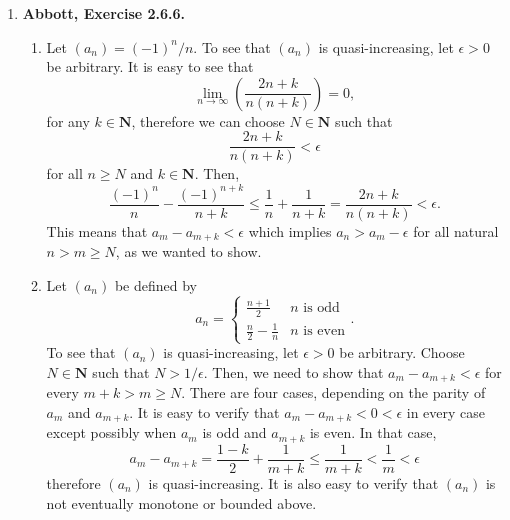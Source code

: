 \documentclass{article}
\makeatletter
\DeclarePairedDelimiter\abs{\lvert}{\rvert}
\let\oldabs\abs
\def\abs{\@ifstar{\oldabs}{\oldabs*}}
\newcommand{\N}{\mathbf{N}}
\newcommand{\exc}[2][Abbott]{\item \textbf{#1, Exercise #2.}}
\newcommand{\lep}[1][L]{#1et $\epsilon > 0$ be arbitrary}
\makeatother
\begin{document}
\begin{enumerate}
    To verify the second claim, \lep[l]. Since $(x_n)$ and $(y_n)$ are pseudo-Cauchy, we can choose $N \in \N$ such that $\abs{x_{n+1}-x_n}, \abs{y_{n+1}-y_n} < \epsilon/2$ for all $n \geq N$. Then, \begin{equation*}
        \abs{(x_{n+1}+y_{n+1}) - (x_n + y_n)} \leq \abs{x_{n+1}-x_n} + \abs{y_{n+1}-y_n} < \epsilon
    \end{equation*} for all $n \geq N$, therefore $(x_n + y_n)$ is also pseudo-Cauchy. 
    
    \exc{2.6.6}
    \begin{enumerate}
        \item Let $(a_n) = (-1)^n/n$. To see that $(a_n)$ is quasi-increasing, \lep[l]. It is easy to see that 
        \begin{equation*}
            \lim_{n \to \infty} \left(\frac{2n+k}{n(n+k)}\right) = 0,
        \end{equation*} for any $k \in \N$, therefore we can choose $N \in \N$ such that
        \begin{equation*}
            \frac{2n+k}{n(n+k)} < \epsilon
        \end{equation*} for all $n \geq N$ and $k \in \N$. Then, 
        \begin{equation*}
            \frac{(-1)^n}{n} - \frac{(-1)^{n+k}}{n+k} \leq \frac{1}{n} + \frac{1}{n+k} = \frac{2n+k}{n(n+k)} < \epsilon.
        \end{equation*} This means that $a_{m}-a_{m+k} < \epsilon$ which implies $a_n > a_m - \epsilon$ for all natural $n > m \geq N$, as we wanted to show.
        
        \item Let $(a_n)$ be defined by 
        \begin{equation*}
            a_n = \begin{cases}
            \frac{n+1}{2} & n \text{ is odd} \\
            \frac{n}{2} - \frac{1}{n} & n \text{ is even}
            \end{cases}.
        \end{equation*} To see that $(a_n)$ is quasi-increasing, \lep[l]. Choose $N \in \N$ such that $N > 1/\epsilon$. Then, we need to show that $a_m - a_{m+k} < \epsilon$ for every $m+k > m \geq N$. There are four cases, depending on the parity of $a_m$ and $a_{m+k}$. It is easy to verify that $a_m-a_{m+k} < 0 < \epsilon$ in every case except possibly when $a_m$ is odd and $a_{m+k}$ is even. In that case, 
        \begin{equation*}
            a_m-a_{m+k} = \frac{1-k}{2} + \frac{1}{m+k} \leq \frac{1}{m+k} < \frac{1}{m} < \epsilon
        \end{equation*} therefore $(a_n)$ is quasi-increasing. It is also easy to verify that $(a_n)$ is not eventually monotone or bounded above.
        

\end{enumerate}
\end{enumerate}
\end{document}
